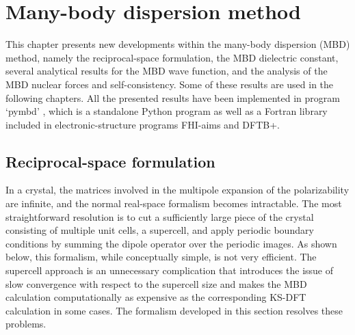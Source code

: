 \chapter{Many-body dispersion method}\label{chap:mbd}

{\sffamily This chapter presents new developments within the many-body dispersion (MBD) method, namely the reciprocal-space formulation, the MBD dielectric constant, several analytical results for the MBD wave function, and the analysis of the MBD nuclear forces and self-consistency.
Some of these results are used in the following chapters.
All the presented results have been implemented in program `pymbd' \citep{HermannZ17}, which is a standalone Python program as well as a Fortran library included in electronic-structure programs FHI-aims and DFTB+.
}

\section{Reciprocal-space formulation}

In a crystal, the matrices involved in the multipole expansion of the polarizability are infinite, and the normal real-space formalism becomes intractable.
The most straightforward resolution is to cut a sufficiently large piece of the crystal consisting of multiple unit cells, a supercell, and apply periodic boundary conditions by summing the dipole operator over the periodic images.
As shown below, this formalism, while conceptually simple, is not very efficient.
The supercell approach is an unnecessary complication that introduces the issue of slow convergence with respect to the supercell size and makes the MBD calculation computationally as expensive as the corresponding KS-DFT calculation in some cases.
The formalism developed in this section resolves these problems.

